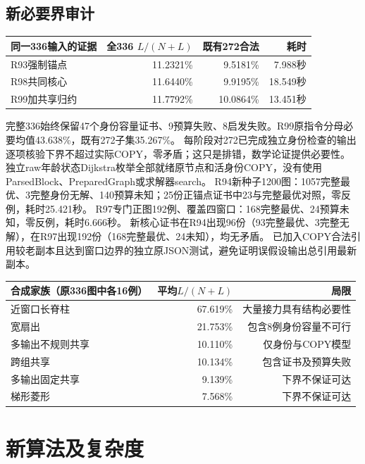 \documentclass[UTF8,11pt,a4paper]{ctexart}
\begin{document}
\subsection{新必要界审计}
\begin{center}
\begin{tabular}{lrrr}
\toprule
同一336输入的证据 & 全336 $L/(N+L)$ & 既有272合法 & 耗时\\
\midrule
R93强制锚点 & 11.2321\% & 9.5181\% & 7.988秒\\
R98共同核心 & 11.6440\% & 9.9195\% & 18.549秒\\
R99加共享归约 & 11.7792\% & 10.0864\% & 13.451秒\\
\bottomrule
\end{tabular}
\end{center}
完整336始终保留47个身份容量证书、9预算失败、8启发失败。R99原指令分母必要均值43.638\%，既有272子集35.267\%。
每阶段对272已完成独立身份检查的输出逐项核验下界不超过实际COPY，零矛盾；这只是排错，数学论证提供必要性。
独立raw年龄状态Dijkstra枚举全部就绪原节点和活身份COPY，没有使用ParsedBlock、PreparedGraph或求解器search。
R94新种子1200图：1057完整最优、3完整身份无解、140预算未知；25份正锚点证书中23与完整最优对照，零反例，耗时25.421秒。
R97专门正图192例、覆盖四窗口：168完整最优、24预算未知，零反例，耗时6.666秒。
新核心证书在R94出现96份（93完整最优、3完整无解），在R97出现192份（168完整最优、24未知），均无矛盾。
已加入COPY合法引用较老副本且达到窗口边界的独立原JSON测试，避免证明误假设输出总引用最新副本。

\begin{center}
\begin{tabular}{lrr}
\toprule
合成家族（原336图中各16例） & 平均$L/(N+L)$ & 局限 \\
\midrule
近窗口长脊柱 & 67.619\% & 大量接力具有结构必要性 \\
宽扇出 & 21.753\% & 包含8例身份容量不可行 \\
多输出不规则共享 & 10.110\% & 仅身份与COPY模型 \\
跨组共享 & 10.134\% & 包含证书及预算失败 \\
多输出固定共享 & 9.139\% & 下界不保证可达 \\
梯形菱形 & 7.568\% & 下界不保证可达 \\
\bottomrule
\end{tabular}
\end{center}

\section{新算法及复杂度}
\end{document}
